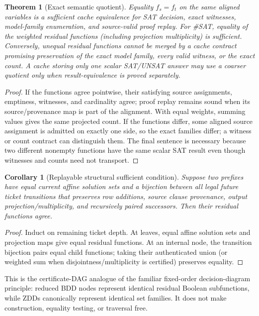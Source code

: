 \documentclass[11pt]{article}
\newtheorem{theorem}{Theorem}
\newtheorem{corollary}{Corollary}
\begin{document}
\begin{theorem}[Exact semantic quotient]
Equality $f_s=f_t$ on the same aligned variables is a sufficient cache equivalence for SAT decision, exact witnesses, model-family enumeration, and source-valid proof replay.  For \#SAT, equality of the weighted residual functions (including projection multiplicity) is sufficient.  Conversely, unequal residual functions cannot be merged by a cache contract promising preservation of the exact model family, every valid witness, or the exact count.  A cache storing only one scalar SAT/UNSAT answer may use a coarser quotient only when result-equivalence is proved separately.
\end{theorem}
\begin{proof}
If the functions agree pointwise, their satisfying source assignments, emptiness, witnesses, and cardinality agree; proof replay remains sound when its source/provenance map is part of the alignment.  With equal weights, summing values gives the same projected count.  If the functions differ, some aligned source assignment is admitted on exactly one side, so the exact families differ; a witness or count contract can distinguish them.  The final sentence is necessary because two different nonempty functions have the same scalar SAT result even though witnesses and counts need not transport.
\end{proof}

\begin{corollary}[Replayable structural sufficient condition]
Suppose two prefixes have equal current affine solution sets and a bijection between all legal future ticket transitions that preserves row additions, source clause provenance, output projection/multiplicity, and recursively paired successors.  Then their residual functions agree.
\end{corollary}
\begin{proof}
Induct on remaining ticket depth.  At leaves, equal affine solution sets and projection maps give equal residual functions.  At an internal node, the transition bijection pairs equal child functions; taking their authenticated union (or weighted sum when disjointness/multiplicity is certified) preserves equality.
\end{proof}

This is the certificate-DAG analogue of the familiar fixed-order decision-diagram principle: reduced BDD nodes represent identical residual Boolean subfunctions, while ZDDs canonically represent identical set families.  It does not make construction, equality testing, or traversal free.
\end{document}
